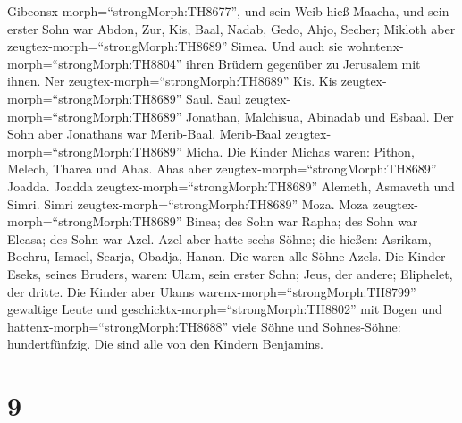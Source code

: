 Gibeonsx-morph=``strongMorph:TH8677'', und sein Weib hieß Maacha,
 und sein erster Sohn war Abdon, Zur, Kis, Baal, Nadab,
 Gedo, Ahjo, Secher;  Mikloth aber
zeugtex-morph=``strongMorph:TH8689'' Simea. Und auch sie
wohntenx-morph=``strongMorph:TH8804'' ihren Brüdern gegenüber zu
Jerusalem mit ihnen.  Ner
zeugtex-morph=``strongMorph:TH8689'' Kis. Kis
zeugtex-morph=``strongMorph:TH8689'' Saul. Saul
zeugtex-morph=``strongMorph:TH8689'' Jonathan, Malchisua, Abinadab und
Esbaal.  Der Sohn aber Jonathans war Merib-Baal. Merib-Baal
zeugtex-morph=``strongMorph:TH8689'' Micha.  Die Kinder
Michas waren: Pithon, Melech, Tharea und Ahas.  Ahas aber
zeugtex-morph=``strongMorph:TH8689'' Joadda. Joadda
zeugtex-morph=``strongMorph:TH8689'' Alemeth, Asmaveth und Simri. Simri
zeugtex-morph=``strongMorph:TH8689'' Moza.  Moza
zeugtex-morph=``strongMorph:TH8689'' Binea; des Sohn war Rapha; des Sohn
war Eleasa; des Sohn war Azel.  Azel aber hatte sechs
Söhne; die hießen: Asrikam, Bochru, Ismael, Searja, Obadja, Hanan. Die
waren alle Söhne Azels.  Die Kinder Eseks, seines Bruders,
waren: Ulam, sein erster Sohn; Jeus, der andere; Eliphelet, der dritte.
 Die Kinder aber Ulams warenx-morph=``strongMorph:TH8799''
gewaltige Leute und geschicktx-morph=``strongMorph:TH8802'' mit Bogen
und hattenx-morph=``strongMorph:TH8688'' viele Söhne und Sohnes-Söhne:
hundertfünfzig. Die sind alle von den Kindern Benjamins.

\hypertarget{section-8}{%
\section{9}\label{section-8}}

